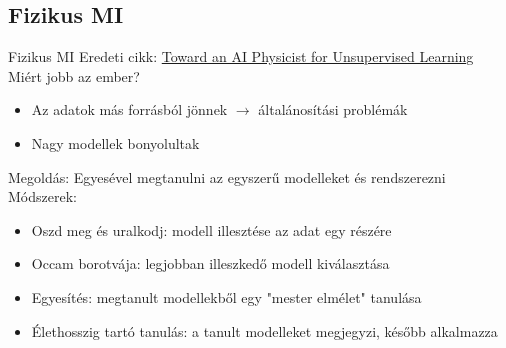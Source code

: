 \subsection{Fizikus MI}
\begin{frame}{Fizikus MI}
    Eredeti cikk: \href{https://arxiv.org/pdf/1810.10525.pdf}{Toward an AI Physicist for Unsupervised Learning} \\
    Miért jobb az ember?
    \begin{itemize}
        \item Az adatok más forrásból jönnek $\rightarrow$ általánosítási problémák
        \item Nagy modellek bonyolultak
    \end{itemize}
    Megoldás: Egyesével megtanulni az egyszerű modelleket és rendszerezni \\
    Módszerek:
    \begin{itemize}
        \item Oszd meg és uralkodj: modell illesztése az adat egy részére
        \item Occam borotvája: legjobban illeszkedő modell kiválasztása
        \item Egyesítés: megtanult modellekből egy "mester elmélet" tanulása
        \item Élethosszig tartó tanulás: a tanult modelleket megjegyzi, később alkalmazza
    \end{itemize}
\end{frame}

